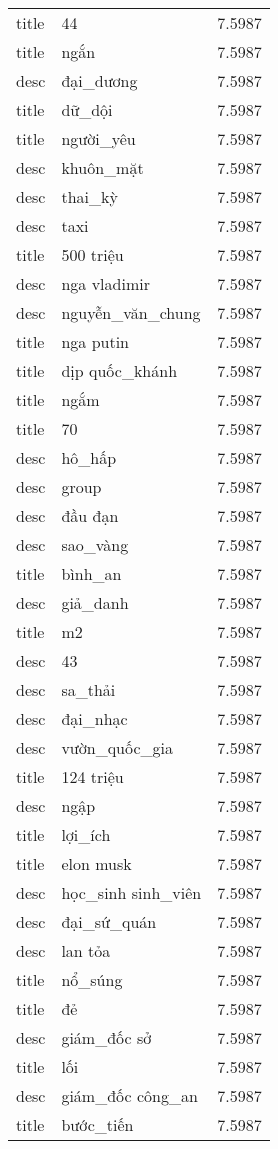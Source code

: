 \documentclass{article}
\begin{document}
\begin{tabular}{lll}
title & 44 & 7.5987\\
title & ngắn & 7.5987\\
desc & đại\_dương & 7.5987\\
title & dữ\_dội & 7.5987\\
title & người\_yêu & 7.5987\\
desc & khuôn\_mặt & 7.5987\\
desc & thai\_kỳ & 7.5987\\
desc & taxi & 7.5987\\
title & 500 triệu & 7.5987\\
desc & nga vladimir & 7.5987\\
desc & nguyễn\_văn\_chung & 7.5987\\
title & nga putin & 7.5987\\
title & dịp quốc\_khánh & 7.5987\\
title & ngắm & 7.5987\\
title & 70 & 7.5987\\
desc & hô\_hấp & 7.5987\\
desc & group & 7.5987\\
desc & đầu đạn & 7.5987\\
desc & sao\_vàng & 7.5987\\
title & bình\_an & 7.5987\\
desc & giả\_danh & 7.5987\\
title & m2 & 7.5987\\
desc & 43 & 7.5987\\
desc & sa\_thải & 7.5987\\
desc & đại\_nhạc & 7.5987\\
desc & vườn\_quốc\_gia & 7.5987\\
title & 124 triệu & 7.5987\\
desc & ngập & 7.5987\\
title & lợi\_ích & 7.5987\\
title & elon musk & 7.5987\\
desc & học\_sinh sinh\_viên & 7.5987\\
desc & đại\_sứ\_quán & 7.5987\\
desc & lan tỏa & 7.5987\\
title & nổ\_súng & 7.5987\\
title & đẻ & 7.5987\\
desc & giám\_đốc sở & 7.5987\\
title & lối & 7.5987\\
desc & giám\_đốc công\_an & 7.5987\\
title & bước\_tiến & 7.5987\\

\end{tabular}
\end{document}
